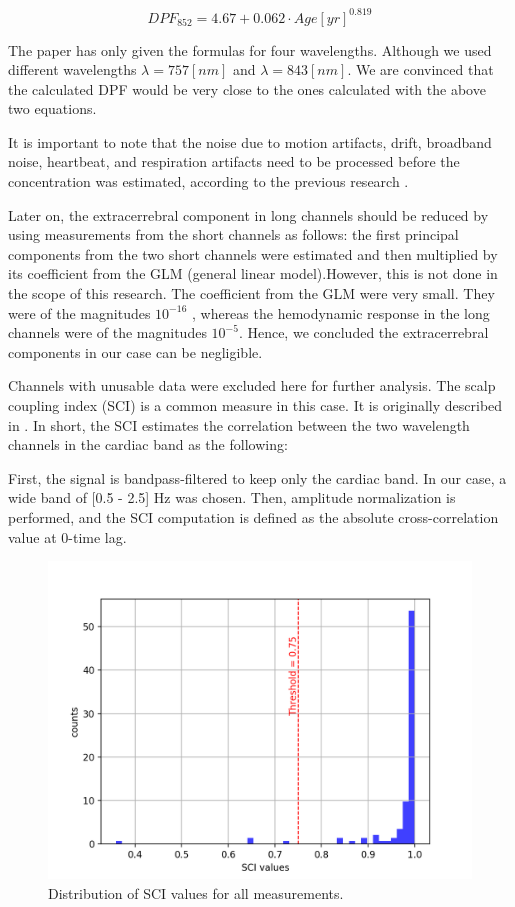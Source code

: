 \[
DPF_{852} = 4.67 + 0.062 \cdot Age[yr]^{0.819}
\]

The paper has only given the formulas for four wavelengths. Although we used different wavelengths $\lambda = 757 [nm]$ and $\lambda = 843 [nm]$. We are convinced that the calculated DPF would be very close to the ones calculated with the above two equations.


It is important to note that the noise due to motion artifacts, drift, broadband noise, heartbeat, and respiration artifacts need to be processed before the concentration was estimated, according to the previous research \cite {Huppert:09}.

Later on, the extracerrebral component in long channels should be reduced by using measurements from the short channels as follows: the first principal components from the two short channels were estimated and then multiplied by its coefficient from the GLM (general linear model).However, this is not done in the scope of this research. The coefficient from the GLM were very small. They were of the magnitudes $10^{-16}$ , whereas the hemodynamic response in the long channels were of the magnitudes $10^{-5}$. Hence, we concluded the extracerrebral components in our case can be negligible.

Channels with unusable data were excluded here for further analysis. The scalp coupling index (SCI) is a common measure in this case. It is originally described in \cite {polloniniSCI}. In short, the SCI estimates the correlation between the two wavelength channels in the cardiac band as the following:

First, the signal is bandpass-filtered to keep only the cardiac band. In our case, a wide band of [0.5 - 2.5] Hz was chosen. Then, amplitude normalization is performed, and the SCI computation is defined as the absolute cross-correlation value at 0-time lag.


\begin{figure}[H]
  \centering
    \includegraphics[scale=.75]{bilder/SCI_hist.png}
  \caption{Distribution of SCI values for all measurements.}
  \label{fig:somesignal}
\end{figure}




